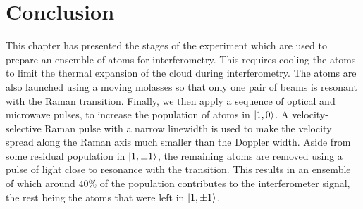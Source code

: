 \section{Conclusion}
This chapter has presented the stages of the experiment which are used
to prepare an ensemble of atoms for interferometry. This requires
cooling the atoms to limit the thermal expansion of the cloud during
interferometry. The atoms are also launched using a moving molasses so
that only one pair of beams is resonant with the Raman transition.
Finally, we then apply a sequence of optical and microwave pulses, to
increase the population of atoms in \(\ket{1,0}\). A
velocity-selective Raman pulse with a narrow linewidth is used to make
the velocity spread along the Raman axis much smaller than the Doppler
width. Aside from some residual population in \(\ket{1,\pm 1}\), the
remaining atoms are removed using a pulse of light close to resonance
with the  transition. This results in an ensemble of which
around \(40\%\) of the population contributes to the interferometer
signal, the rest being the atoms that were left in \(\ket{1,\pm1}\).

